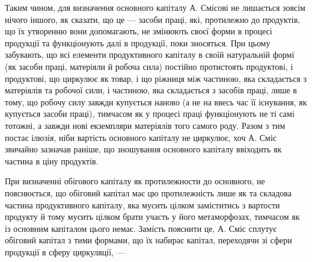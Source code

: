 Таким чином, для визначення основного капіталу А. Смісові не лишається
зовсім нічого іншого, як сказати, що це — засоби праці, які, протилежно
до продуктів, що їх утворенню вони допомагають, не змінюють
своєї форми в процесі продукції та функціонують далі в продукції, поки
зносяться. При цьому забувають, що всі елементи продуктивного капіталу
в своїй натуральній формі (як засоби праці, матеріяли й робоча сила)
постійно протистоять продуктові, і продуктові, що циркулює як товар,
і що ріжниця між частиною, яка складається з матеріялів та робочої
сили, і частиною, яка складається з засобів праці, лише в тому, що
робочу силу завжди купується наново (а не на ввесь час її існування,
як купується засоби праці), тимчасом як у процесі праці функціонують
не ті самі тотожні, а завжди нові екземпляри матеріялів того самого роду.
Разом з тим постає ілюзія, ніби вартість основного капіталу не циркулює,
хоч А. Сміс звичайно зазначав раніше, що зношування основного
капіталу ввіходить як частина в ціну продуктів.

При визначенні обігового капіталу як протилежности до основного,
не пояснюється, що обіговий капітал має цю протилежність лише як та
складова частина продуктивного капіталу, яка мусить цілком заміститись
з вартости продукту й тому мусить цілком брати участь у його
метаморфозах, тимчасом як із основним капіталом цього немає. Замість
пояснити це, А. Сміс сплутує обіговий капітал з тими формами, що їх
набирає капітал, переходячи зі сфери продукції в сферу циркуляції, —
\parbreak{}  %
